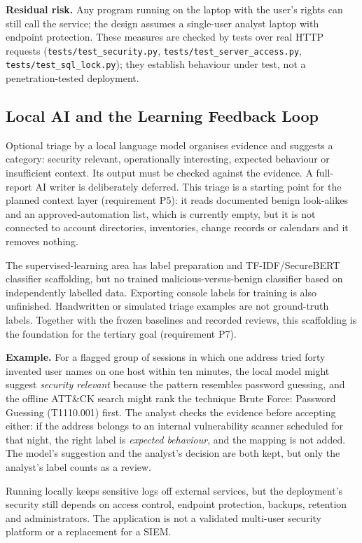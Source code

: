 \documentclass[11pt,a4paper]{article}
\begin{document}
\textbf{Residual risk.} Any program running on the laptop with the user's rights can still call the service; the design assumes a single-user analyst laptop with endpoint protection. These measures are checked by tests over real HTTP requests (\nolinkurl{tests/test_security.py}, \nolinkurl{tests/test_server_access.py}, \nolinkurl{tests/test_sql_lock.py}); they establish behaviour under test, not a penetration-tested deployment.

\subsection{Local AI and the Learning Feedback Loop}\label{sec:localai}

Optional triage by a local language model organises evidence and suggests a category: security relevant, operationally interesting, expected behaviour or insufficient context. Its output must be checked against the evidence. A full-report AI writer is deliberately deferred. This triage is a starting point for the planned context layer (requirement P5): it reads documented benign look-alikes and an approved-automation list, which is currently empty, but it is not connected to account directories, inventories, change records or calendars and it removes nothing.

The supervised-learning area has label preparation and TF-IDF/SecureBERT classifier scaffolding, but no trained malicious-versus-benign classifier based on independently labelled data. Exporting console labels for training is also unfinished. Handwritten or simulated triage examples are not ground-truth labels. Together with the frozen baselines and recorded reviews, this scaffolding is the foundation for the tertiary goal (requirement P7).

\textbf{Example.} For a flagged group of sessions in which one address tried forty invented user names on one host within ten minutes, the local model might suggest \emph{security relevant} because the pattern resembles password guessing, and the offline ATT\&CK search might rank the technique Brute Force: Password Guessing (T1110.001) first. The analyst checks the evidence before accepting either: if the address belongs to an internal vulnerability scanner scheduled for that night, the right label is \emph{expected behaviour}, and the mapping is not added. The model's suggestion and the analyst's decision are both kept, but only the analyst's label counts as a review.

Running locally keeps sensitive logs off external services, but the deployment's security still depends on access control, endpoint protection, backups, retention and administrators. The application is not a validated multi-user security platform or a replacement for a SIEM.
\end{document}
